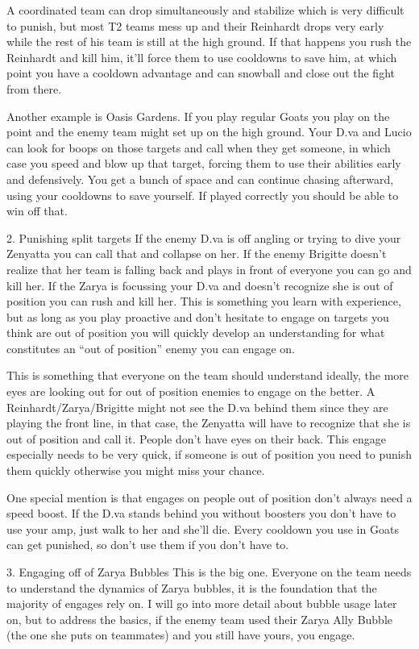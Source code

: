 A coordinated team can drop simultaneously and stabilize which is very difficult to punish, but most T2 teams mess up and their Reinhardt drops very early while the rest of his team is still at the high ground. If that happens you rush the Reinhardt and kill him, it’ll force them to use cooldowns to save him, at which point you have a cooldown advantage and can snowball and close out the fight from there.

Another example is Oasis Gardens. If you play regular Goats you play on the point and the enemy team might set up on the high ground. Your D.va and Lucio can look for boops on those targets and call when they get someone, in which case you speed and blow up that target, forcing them to use their abilities early and defensively. You get a bunch of space and can continue chasing afterward, using your cooldowns to save yourself. If played correctly you should be able to win off that.

2. Punishing split targets
    If the enemy D.va is off angling or trying to dive your Zenyatta you can call that and collapse on her. If the enemy Brigitte doesn’t realize that her team is falling back and plays in front of everyone you can go and kill her. If the Zarya is focussing your D.va and doesn’t recognize she is out of position you can rush and kill her. This is something you learn with experience, but as long as you play proactive and don’t hesitate to engage on targets you think are out of position you will quickly develop an understanding for what constitutes an “out of position” enemy you can engage on.

This is something that everyone on the team should understand ideally, the more eyes are looking out for out of position enemies to engage on the better. A Reinhardt/Zarya/Brigitte might not see the D.va behind them since they are playing the front line, in that case, the Zenyatta will have to recognize that she is out of position and call it. People don’t have eyes on their back. This engage especially needs to be very quick, if someone is out of position you need to punish them quickly otherwise you might miss your chance.



One special mention is that engages on people out of position don’t always need a speed boost. If the D.va stands behind you without boosters you don’t have to use your amp, just walk to her and she’ll die. Every cooldown you use in Goats can get punished, so don’t use them if you don’t have to.

3. Engaging off of Zarya Bubbles
This is the big one. Everyone on the team needs to understand the dynamics of Zarya bubbles, it is the foundation that the majority of engages rely on. I will go into more detail about bubble usage later on, but to address the basics, if the enemy team used their Zarya Ally Bubble (the one she puts on teammates) and you still have yours, you engage.

